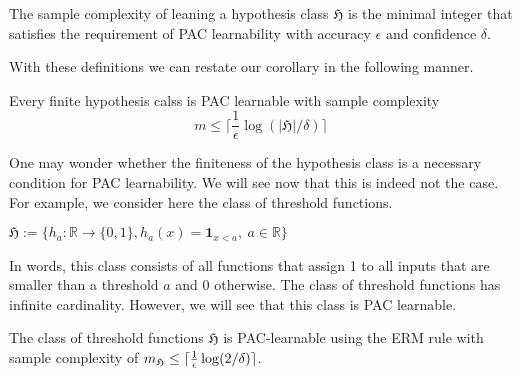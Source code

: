     \begin{definition}
		The sample complexity of leaning a hypothesis class $\mathfrak{H}$ is
		the minimal integer that satisfies the requirement of PAC learnability
		with accuracy $\epsilon$ and confidence $\delta$.
	\end{definition}
	With these definitions we can restate our corollary in the following manner.
	\begin{coro}
		Every finite hypothesis calss is PAC learnable with sample complexity 
		$$
		m \leq \lceil \frac{1}{\epsilon} \log(|\mathfrak{H}|/\delta) \rceil
		$$
	\end{coro}
One may wonder whether the finiteness of the hypothesis class is a necessary
condition for PAC learnability. We will see now that this is indeed not the
case. For example, we consider here the class of threshold functions. 
\begin{definition}
	$\mathfrak{H} := \{h_a:\mathbb{R}\to \{0,1\}, h_a(x)= \mathbf{1}_{x <a} ,\  a\in \mathbb{R}\}$
\end{definition}	
In words, this class consists of all functions that assign 1 to all inputs that
are smaller than a threshold $a$ and 0 otherwise. The class of threshold
functions has infinite cardinality. However, we will see that this class is PAC learnable.
\begin{lemma}
The class of threshold functions	$\mathfrak{H}$ is PAC-learnable using the ERM rule with sample complexity of
	$m_\frak{H} \leq \lceil \frac{1}{\epsilon}\log (2/\delta)\rceil$.
\end{lemma}
